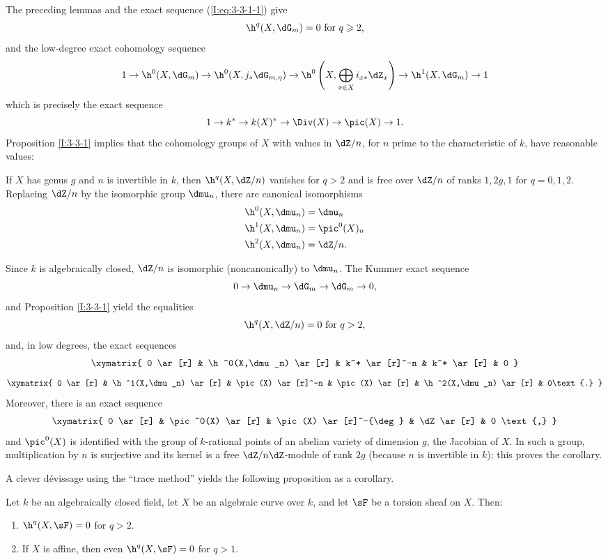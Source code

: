 The preceding lemmas and the exact sequence (\ref{I:eq:3-3-1-1}) give
\[
  \h^q(X,\dG_m) = 0 \text{ for $q\geqslant 2$,}
\]
and the low-degree exact cohomology sequence
\[
  1 \to \h^0(X,\dG_m) \to \h^0(X, j_*\dG_{m,\eta}) \to \h^0\left(X,\bigoplus_{x\in X} i_{x*}\dZ_x\right) \to \h^1(X,\dG_m) \to 1
\]
which is precisely the exact sequence
\[
  1 \to k^* \to k(X)^*\to \Div(X) \to \pic(X) \to 1\text{.}
\]
Proposition \ref{I:3-3-1} implies that the cohomology groups of $X$ with
values in $\dZ/n$, for $n$ prime to the characteristic of $k$, have
reasonable values:

\begin{corollary}\label{I:3-3-5}
If $X$ has genus $g$ and $n$ is invertible in $k$, then
$\h^q(X,\dZ/n)$ vanishes for $q>2$ and is free over $\dZ/n$ of ranks
$1,2g,1$ for $q=0,1,2$. Replacing $\dZ/n$ by the isomorphic group
$\dmu_n$, there are canonical isomorphisms
\begin{align*}
  \h^0(X,\dmu_n) &= \dmu_n \\
  \h^1(X,\dmu_n) &= \pic^0(X)_n \\
  \h^2(X,\dmu_n) &= \dZ/n \text{.}
\end{align*}
\end{corollary}

Since $k$ is algebraically closed, $\dZ/n$ is isomorphic
(noncanonically) to $\dmu_n$. The Kummer exact sequence
\[
  0 \to \dmu_n \to \dG_m \to \dG_m \to 0\text{,}
\]
and Proposition \ref{I:3-3-1} yield the equalities
\[
  \h^q(X,\dZ/n) = 0 \text{ for $q>2$,}
\]
and, in low degrees, the exact sequences
\[\xymatrix{
  0 \ar[r]
    & \h^0(X,\dmu_n) \ar[r]
    & k^* \ar[r]^-n
    & k^* \ar[r]
    & 0
}\]
\[\xymatrix{
  0 \ar[r]
    & \h^1(X,\dmu_n) \ar[r]
    & \pic(X) \ar[r]^-n & \pic(X) \ar[r] & \h^2(X,\dmu_n) \ar[r]
    & 0\text{.}
}\]
Moreover, there is an exact sequence
\[\xymatrix{
  0 \ar[r]
    & \pic^0(X) \ar[r]
    & \pic(X) \ar[r]^-{\deg}
    & \dZ \ar[r]
    & 0 \text{,}
}\]
and $\pic^0(X)$ is identified with the group of $k$-rational points of
an abelian variety of dimension $g$, the Jacobian of $X$. In such a
group, multiplication by $n$ is surjective and its kernel is a free
$\dZ/n\dZ$-module of rank $2g$ (because $n$ is invertible in $k$);
this proves the corollary.

A clever dévissage using the “trace method” yields the following
proposition as a corollary.

\begin{proposition}\label{I:3-3-6}
Let $k$ be an algebraically closed field, let $X$ be an algebraic curve
over $k$, and let $\sF$ be a torsion sheaf on $X$. Then:
\begin{enumerate}[\indent i)]
  \item $\h^q(X,\sF)=0$ for $q>2$.
  \item If $X$ is affine, then even $\h^q(X,\sF)=0$ for $q>1$.
\end{enumerate}
\end{proposition}

